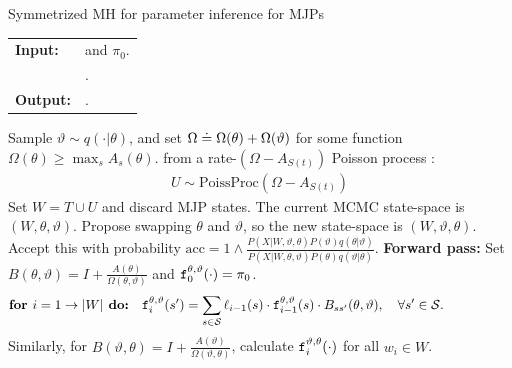 \begin{algorithm} %
   \caption{Symmetrized MH for parameter inference for MJPs }
   \label{alg:MH_improved}
  \begin{tabular}{l l}
   \textbf{Input:  } & \text{The observations $X$,}
                      \text{the MJP path $S(t) = (S, T)$, parameters $\theta$} and $\pi_0$.\\ 
                     & \text{A  Metropolis-Hasting proposal $q(\cdot | \theta)$}.\\
   \textbf{Output:  }& \text{A new MJP trajectory $S'(t) = (S', T')$, 
                            new MJP parameters $\theta'$}.\\
   \hline
   \end{tabular}
   \begin{algorithmic}[1]
      \State Sample $\vartheta \sim q(\cdot| \theta)$, and 
      set %
	$\Omega \doteq \Omega(\theta) + \Omega(\vartheta)$ for some function 
    $\Omega(\theta) \ge \max_s A_s(\theta)$.
       from a rate-$(\Omega-A_{S(t)})$ Poisson process : 
\begin{align*}
  U \sim \text{PoissProc}(\Omega - A_{S(t)}) 
\end{align*}
    \State Set $W = T \cup U$ and discard MJP states.
    \State The current MCMC state-space is $(W,\theta,\vartheta)$. 
    Propose swapping $\theta$ and $\vartheta$, so the new state-space is $(W,\vartheta,\theta)$. 
     Accept this with probability 
     $
     \text{acc} 
        =  1 \wedge \frac{P(X| W,\vartheta,\theta)P(\vartheta)q(\theta|\vartheta)}
        {P(X| W,\theta, \vartheta)P(\theta) q(\vartheta|\theta)}.
        $
        \State \textbf{Forward pass:} Set $B(\theta,\vartheta) = I + \frac{A(\theta)}{\Omega(\theta, \vartheta)}$ and $\mathtt{f}^{\theta, \vartheta}_0(\cdot) = \pi_0$.
    $$\textbf{for } i=1\rightarrow |W|\textbf{ do:} \quad \mathtt{f}^{\theta,\vartheta}_i(s') = \sum_{s \in {\mathcal S}} \ell_{i-1}(s) \cdot \mathtt{f}^{\theta,\vartheta}_{i-1}(s)\cdot B_{ss'}(\theta,\vartheta), \quad \forall s' \in {\mathcal S}.\qquad\qquad\quad $$
    Similarly, for $B(\vartheta,\theta) = I + \frac{A(\vartheta)}{\Omega(\vartheta, \theta)}$, calculate $\mathtt{f}^{\vartheta,\theta}_i(\cdot)$ for all $w_i \in W$.

\end{algorithmic}
\end{algorithm}
